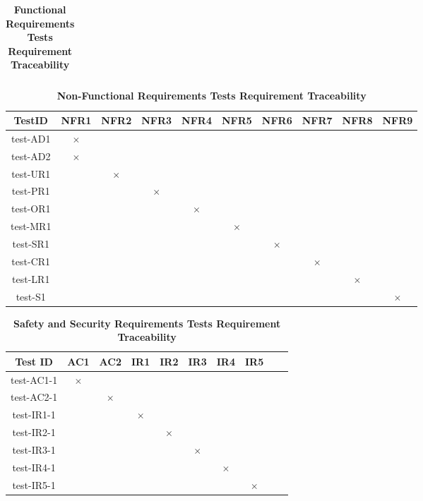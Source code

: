 \documentclass[12pt, titlepage]{article}
\begin{document}
\begin{landscape}
\begin{table}[H]
\begin{tabular}{|c|c|c|c|c|c|c|c|c|c|c|c|c|c|c|}
\end{tabular}
\caption{\bf Functional Requirements Tests Requirement Traceability} \label{tab:fr-test-traceability}
\end{table}

\end{landscape}
\newpage

\begin{table} [H]
  \centering
  \begin{tabular}{|c|c|c|c|c|c|c|c|c|c|}
    \hline
    TestID & NFR1 & NFR2 & NFR3 & NFR4 & NFR5 & NFR6 & NFR7 & NFR8 & NFR9 \\
    \hline
    test-AD1 & $\times$ & & & & & & & & \\
    \hline
    test-AD2 &  $\times$ & & & & & & & & \\
    \hline
    test-UR1 & & $\times$ &  & & & & & & \\
    \hline
    test-PR1 & & & $\times$ & & & & & & \\
    \hline
    test-OR1 & & & & $\times$ & & & & &  \\
    \hline
    test-MR1 & & & & & $\times$ & & & &\\
    \hline
    test-SR1 & & & & & & $\times$ & & &\\
    \hline
    test-CR1 & & & & & & & $\times$ & &\\
    \hline
    test-LR1 & & & & & & & & $\times$ &\\
    \hline
    test-S1 & & & & & & & & & $\times$ \\
    \hline
  \end{tabular}
\caption{\bf Non-Functional Requirements Tests Requirement Traceability} \label{tab:nfr-test-traceability}
\end{table}


\begin{table} [H]
  \centering
  \begin{tabular}{|c|c|c|c|c|c|c|c|c|c|}
  \hline
  Test ID & AC1 & AC2 & IR1 & IR2 & IR3 & IR4 & IR5 \\
  \hline
  test-AC1-1 & $\times$ & & & & & & \\
  \hline
  test-AC2-1 & & $\times$ & & & & & \\
  \hline
  test-IR1-1 & & & $\times$ & & & & \\
  \hline
  test-IR2-1  & & & & $\times$ & & & \\
  \hline
  test-IR3-1  & & & & & $\times$ & &\\
  \hline
  test-IR4-1  & & & & & & $\times$ & \\
  \hline
  test-IR5-1  & & & & & & & $\times$ \\
  \hline
\end{tabular}
\caption{\bf Safety and Security Requirements Tests Requirement Traceability} \label{tab:sns-test-traceability}
\end{table}
\end{document}

